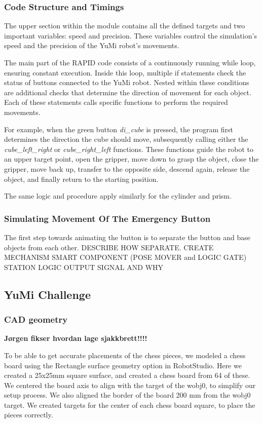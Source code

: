 \documentclass[a4paper,12pt]{article}
\begin{document}
\subsubsection{Code Structure and Timings}
The upper section within the module contains all the defined targets and two important variables: speed and precision. These variables control the simulation's speed and the precision of the YuMi robot's movements.

The main part of the RAPID code consists of a continuously running while loop, ensuring constant execution. Inside this loop, multiple if statements check the status of buttons connected to the YuMi robot. Nested within these conditions are additional checks that determine the direction of movement for each object. Each of these statements calls specific functions to perform the required movements.

For example, when the green button \textit{di\_cube} is pressed, the program first determines the direction the cube should move, subsequently calling either the \textit{cube\_left\_right} or \textit{cube\_right\_left} functions. These functions guide the robot to an upper target point, open the gripper, move down to grasp the object, close the gripper, move back up, transfer to the opposite side, descend again, release the object, and finally return to the starting position.

The same logic and procedure apply similarly for the cylinder and prism.





\subsubsection{Simulating Movement Of The Emergency Button}
The first step towards animating the button is to separate the button and base objects from each other. 
DESCRIBE HOW SEPARATE. 
CREATE MECHANISM
SMART COMPONENT (POSE MOVER and LOGIC GATE)
STATION LOGIC
OUTPUT SIGNAL AND WHY


\subsection{YuMi Challenge}
\subsubsection{CAD geometry}
\textbf{Jørgen fikser hvordan lage sjakkbrett!!!!}

To be able to get accurate placements of the chess pieces, we modeled a chess board using the Rectangle surface geometry option in RobotStudio. Here we created a 25x25mm square surface, and created a chess board from 64 of these. We centered the board axis to align with the target of the wobj0, to simplify our setup process. We also aligned the border of the board 200 mm from the wobj0 target. 
We created targets for the center of each chess board square, to place the pieces correctly. 
\end{document}
